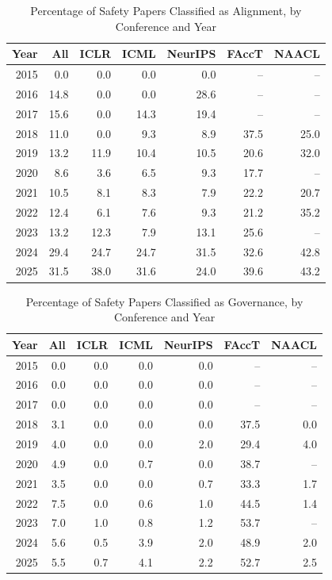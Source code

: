 \begin{table}[ht]
\centering
\caption{Percentage of Safety Papers Classified as Alignment, by Conference and Year} 
\label{tab:summary_alignment}
\begin{tabular}{rrrrrrr}
  \hline
Year & All & ICLR & ICML & NeurIPS & FAccT & NAACL \\ 
  \hline
2015 & 0.0 & 0.0 & 0.0 & 0.0 & -- & -- \\ 
  2016 & 14.8 & 0.0 & 0.0 & 28.6 & -- & -- \\ 
  2017 & 15.6 & 0.0 & 14.3 & 19.4 & -- & -- \\ 
  2018 & 11.0 & 0.0 & 9.3 & 8.9 & 37.5 & 25.0 \\ 
  2019 & 13.2 & 11.9 & 10.4 & 10.5 & 20.6 & 32.0 \\ 
  2020 & 8.6 & 3.6 & 6.5 & 9.3 & 17.7 & -- \\ 
  2021 & 10.5 & 8.1 & 8.3 & 7.9 & 22.2 & 20.7 \\ 
  2022 & 12.4 & 6.1 & 7.6 & 9.3 & 21.2 & 35.2 \\ 
  2023 & 13.2 & 12.3 & 7.9 & 13.1 & 25.6 & -- \\ 
  2024 & 29.4 & 24.7 & 24.7 & 31.5 & 32.6 & 42.8 \\ 
  2025 & 31.5 & 38.0 & 31.6 & 24.0 & 39.6 & 43.2 \\ 
   \hline
\end{tabular}
\end{table}
\begin{table}[ht]
\centering
\caption{Percentage of Safety Papers Classified as Governance, by Conference and Year} 
\label{tab:summary_governance}
\begin{tabular}{rrrrrrr}
  \hline
Year & All & ICLR & ICML & NeurIPS & FAccT & NAACL \\ 
  \hline
2015 & 0.0 & 0.0 & 0.0 & 0.0 & -- & -- \\ 
  2016 & 0.0 & 0.0 & 0.0 & 0.0 & -- & -- \\ 
  2017 & 0.0 & 0.0 & 0.0 & 0.0 & -- & -- \\ 
  2018 & 3.1 & 0.0 & 0.0 & 0.0 & 37.5 & 0.0 \\ 
  2019 & 4.0 & 0.0 & 0.0 & 2.0 & 29.4 & 4.0 \\ 
  2020 & 4.9 & 0.0 & 0.7 & 0.0 & 38.7 & -- \\ 
  2021 & 3.5 & 0.0 & 0.0 & 0.7 & 33.3 & 1.7 \\ 
  2022 & 7.5 & 0.0 & 0.6 & 1.0 & 44.5 & 1.4 \\ 
  2023 & 7.0 & 1.0 & 0.8 & 1.2 & 53.7 & -- \\ 
  2024 & 5.6 & 0.5 & 3.9 & 2.0 & 48.9 & 2.0 \\ 
  2025 & 5.5 & 0.7 & 4.1 & 2.2 & 52.7 & 2.5 \\ 
   \hline
\end{tabular}
\end{table}
